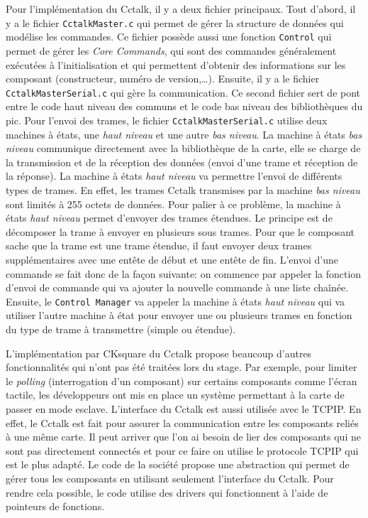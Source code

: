 \documentclass[a4paper]{article}
\begin{document}
Pour l'implémentation du Cctalk, il y a deux fichier principaux. Tout d'abord,
il y a le fichier \verb|CctalkMaster.c| qui permet de gérer la structure de
données qui modélise les commandes. Ce fichier possède aussi une fonction
\verb|Control| qui permet de gérer les \textit{Core Commands}, qui sont des
commandes généralement exécutées à l'initialisation et qui permettent d'obtenir
des informations sur les composant (constructeur, numéro de version,\dots).
Ensuite, il y a le fichier \verb|CctalkMasterSerial.c| qui gère la
communication. Ce second fichier sert de pont entre le code haut niveau des
communs et le code bas niveau des bibliothèques du \gls{pic}. Pour l'envoi des
trames, le fichier \verb|CctalkMasterSerial.c| utilise deux machines à états,
une \textit{haut niveau} et une autre \textit{bas niveau}. La machine à états
\textit{bas niveau} communique directement avec la bibliothèque de la carte,
elle se charge de la transmission et de la réception des données (envoi d'une
trame et réception de la réponse). La machine à états \textit{haut niveau} va
permettre l'envoi de différents types de trames. En effet, les trames Cctalk
transmises par la machine \textit{bas niveau} sont limités à 255 octets de
données. Pour palier à ce problème, la machine à états \textit{haut niveau}
permet d'envoyer des trames étendues. Le principe est de décomposer la trame à
envoyer en plusieurs sous trames. Pour que le composant sache que la trame est
une trame étendue, il faut envoyer deux trames supplémentaires avec une entête
de début et une entête de fin. L'envoi d'une commande se fait donc de la façon
suivante: on commence par appeler la fonction d'envoi de commande qui va ajouter
la nouvelle commande à une liste chaînée. Ensuite, le \verb|Control Manager| va
appeler la machine à états \textit{haut niveau} qui va utiliser l'autre machine
à état pour envoyer une ou plusieurs trames en fonction du type de trame à
transmettre (simple ou étendue).

L'implémentation par CKsquare du Cctalk propose beaucoup d'autres
fonctionnalités qui n'ont pas été traitées lors du stage. Par exemple, pour
limiter le \textit{polling} (interrogation d'un composant) sur certains
composants comme l'écran tactile, les développeurs ont mis en place un système
permettant à la carte de passer en mode esclave. L'interface du Cctalk est aussi
utilisée avec le TCPIP. En effet, le Cctalk est fait pour assurer la
communication entre les composants reliés à une même carte. Il peut arriver que
l'on ai besoin de lier des composants qui ne sont pas directement connectés et
pour ce faire on utilise le protocole TCPIP qui est le plus adapté. Le code de
la société propose une abstraction qui permet de gérer tous les composants en
utilisant seulement l'interface du Cctalk. Pour rendre cela possible, le code
utilise des drivers qui fonctionnent à l'aide de pointeurs de fonctions.
\end{document}

